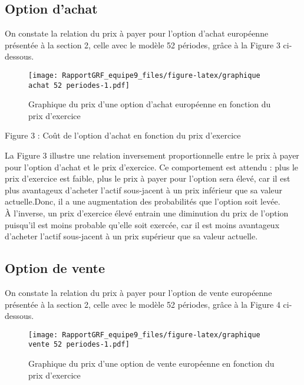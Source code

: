 \documentclass[
]{article}
\begin{document}
\subsection{Option d'achat}\label{option-dachat}

On constate la relation du prix à payer pour l'option d'achat européenne
présentée à la section 2, celle avec le modèle 52 périodes, grâce à la
Figure 3 ci-dessous.

\begin{figure}
\centering
\texttt{[image: RapportGRF\_equipe9\_files/figure-latex/graphique achat 52 periodes-1.pdf]}
\caption{Graphique du prix d'une option d'achat européenne en fonction
du prix d'exercice}
\end{figure}

\begin{center}
\textsf{Figure 3 : Coût de l'option d'achat en fonction du prix d'exercice}
\end{center}

La Figure 3 illustre une relation inversement proportionnelle entre le
prix à payer pour l'option d'achat et le prix d'exercice. Ce
comportement est attendu : plus le prix d'exercice est faible, plus le
prix à payer pour l'option sera élevé, car il est plus avantageux
d'acheter l'actif sous-jacent à un prix inférieur que sa valeur
actuelle.Donc, il a une augmentation des probabilités que l'option soit
levée.\\
À l'inverse, un prix d'exercice élevé entrain une diminution du prix de
l'option puisqu'il est moins probable qu'elle soit exercée, car il est
moins avantageux d'acheter l'actif sous-jacent à un prix supérieur que
sa valeur actuelle.

\newpage

\subsection{Option de vente}\label{option-de-vente}

On constate la relation du prix à payer pour l'option de vente
européenne présentée à la section 2, celle avec le modèle 52 périodes,
grâce à la Figure 4 ci-dessous.

\begin{figure}
\centering
\texttt{[image: RapportGRF\_equipe9\_files/figure-latex/graphique vente 52 periodes-1.pdf]}
\caption{Graphique du prix d'une option de vente européenne en fonction
du prix d'exercice}
\end{figure}
\end{document}
